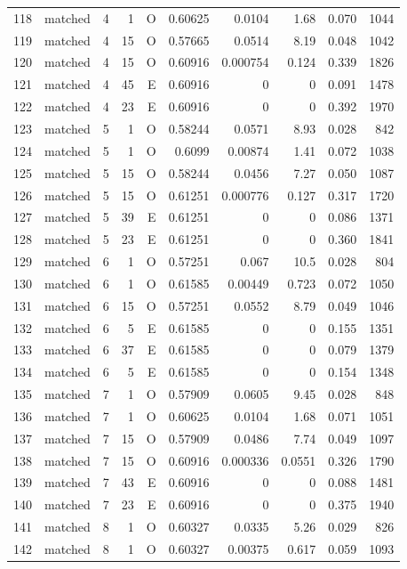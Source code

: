 \begin{longtable}{rlrrrrrrrr}
118 & matched & 4 & 1 & O & 0.60625 & 0.0104 & 1.68 & 0.070 & 1044 \\
119 & matched & 4 & 15 & O & 0.57665 & 0.0514 & 8.19 & 0.048 & 1042 \\
120 & matched & 4 & 15 & O & 0.60916 & 0.000754 & 0.124 & 0.339 & 1826 \\
121 & matched & 4 & 45 & E & 0.60916 & 0 & 0 & 0.091 & 1478 \\
122 & matched & 4 & 23 & E & 0.60916 & 0 & 0 & 0.392 & 1970 \\
123 & matched & 5 & 1 & O & 0.58244 & 0.0571 & 8.93 & 0.028 & 842 \\
124 & matched & 5 & 1 & O & 0.6099 & 0.00874 & 1.41 & 0.072 & 1038 \\
125 & matched & 5 & 15 & O & 0.58244 & 0.0456 & 7.27 & 0.050 & 1087 \\
126 & matched & 5 & 15 & O & 0.61251 & 0.000776 & 0.127 & 0.317 & 1720 \\
127 & matched & 5 & 39 & E & 0.61251 & 0 & 0 & 0.086 & 1371 \\
128 & matched & 5 & 23 & E & 0.61251 & 0 & 0 & 0.360 & 1841 \\
129 & matched & 6 & 1 & O & 0.57251 & 0.067 & 10.5 & 0.028 & 804 \\
130 & matched & 6 & 1 & O & 0.61585 & 0.00449 & 0.723 & 0.072 & 1050 \\
131 & matched & 6 & 15 & O & 0.57251 & 0.0552 & 8.79 & 0.049 & 1046 \\
132 & matched & 6 & 5 & E & 0.61585 & 0 & 0 & 0.155 & 1351 \\
133 & matched & 6 & 37 & E & 0.61585 & 0 & 0 & 0.079 & 1379 \\
134 & matched & 6 & 5 & E & 0.61585 & 0 & 0 & 0.154 & 1348 \\
135 & matched & 7 & 1 & O & 0.57909 & 0.0605 & 9.45 & 0.028 & 848 \\
136 & matched & 7 & 1 & O & 0.60625 & 0.0104 & 1.68 & 0.071 & 1051 \\
137 & matched & 7 & 15 & O & 0.57909 & 0.0486 & 7.74 & 0.049 & 1097 \\
138 & matched & 7 & 15 & O & 0.60916 & 0.000336 & 0.0551 & 0.326 & 1790 \\
139 & matched & 7 & 43 & E & 0.60916 & 0 & 0 & 0.088 & 1481 \\
140 & matched & 7 & 23 & E & 0.60916 & 0 & 0 & 0.375 & 1940 \\
141 & matched & 8 & 1 & O & 0.60327 & 0.0335 & 5.26 & 0.029 & 826 \\
142 & matched & 8 & 1 & O & 0.60327 & 0.00375 & 0.617 & 0.059 & 1093 \\

\end{longtable}
